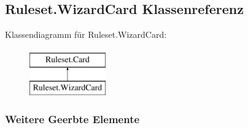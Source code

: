 \hypertarget{a00018}{\subsection{Ruleset.\-Wizard\-Card Klassenreferenz}
\label{a00018}
}
Klassendiagramm für Ruleset.\-Wizard\-Card\-:\begin{figure}[H]
\begin{center}
\leavevmode
\includegraphics[height=2.000000cm]{a00018}
\end{center}
\end{figure}
\subsubsection*{Weitere Geerbte Elemente}
